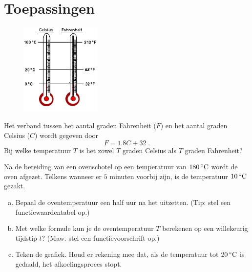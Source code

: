 \documentclass[12pt]{article}
\begin{document}
\begin{oefening}
\end{oefening}

\newpage
\section{Toepassingen}

\begin{oefening}
\begin{figure}
\vspace*{-1.75cm}
\begin{center}
  \includegraphics[width=4cm]{CelsiusFahrenheitThermo}
\end{center}
\end{figure}
Het verband tussen het aantal graden Fahrenheit ($F$) en het aantal graden Celsius ($C$) wordt gegeven door$$F=1.8C+32\;.$$
Bij welke temperatuur $T$ is het zowel $T$ graden Celsius als $T$ graden Fahrenheit?
\end{oefening}

\begin{oefening}
Na de bereiding van een ovenschotel op een temperatuur van $180\grC$ wordt de oven afgezet. Telkens wanneer er $5$ minuten voorbij zijn, is de temperatuur $10\grC$ gezakt.
\begin{enumerate}[(a)]
  \item Bepaal de oventemperatuur een half uur na het uitzetten. (Tip: stel een functiewaardentabel op.)
  \item Met welke formule kun je de oventemperatuur $T$ berekenen op een willekeurig tijdstip $t$? (Maw. stel een functievoorschrift op.)
  \item Teken de grafiek. Houd er rekening mee dat, als de temperatuur tot $20\grC$ is gedaald, het afkoelingsproces stopt.
\end{enumerate}
\end{oefening}
\end{document}
